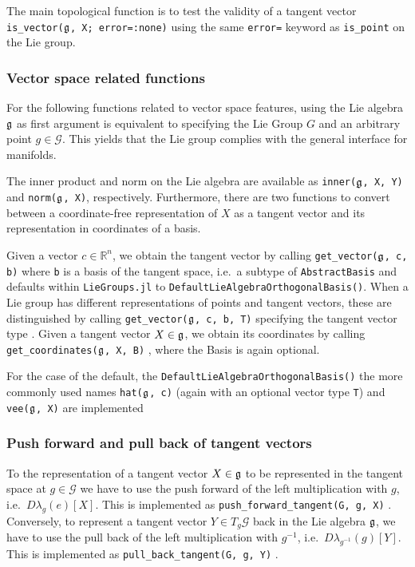 \documentclass{juliacon}
\begin{document}
The main topological function is to test the validity of a tangent vector \verb|is_vector(|$\frak g$\verb|, X; error=:none)| using the same \verb|error=| keyword as \verb|is_point| on the Lie group.

\subsubsection*{Vector space related functions}
For the following functions related to vector space features, using the Lie algebra $\frak g$ as first argument is equivalent to specifying the Lie Group $G$ and an arbitrary point $g \in \mathcal G$. This yields that the Lie group complies with the general interface for manifolds.

The inner product and norm on the Lie algebra are available as \verb|inner(|$\frak g$\verb|, X, Y)| and \verb|norm(|$\frak g$\verb|, X)|, respectively.
Furthermore, there are two functions to convert between a coordinate-free representation of $X$ as a tangent vector and its representation in coordinates of a basis.

Given a vector $c \in \mathbb R^n$, we obtain the tangent vector by calling \verb|get_vector(|$\frak g$\verb|, c, b)| where \verb|b| is a basis of the tangent space, i.e.\ a subtype of \verb|AbstractBasis| and defaults within \verb|LieGroups.jl| to \verb|DefaultLieAlgebraOrthogonalBasis()|.
When a Lie group has different representations of points and tangent vectors, these are distinguished by calling \verb|get_vector(|$\frak g$\verb|, c, b, T)| specifying the tangent vector type%
.
Given a tangent vector $X \in \frak g$, we obtain its coordinates by calling \verb|get_coordinates(|$\frak g$\verb|, X, B)|%
, where the Basis is again optional.

For the case of the default, the \verb|DefaultLieAlgebraOrthogonalBasis()| the more commonly used names \verb|hat(|$\frak g$\verb|, c)|
(again with an optional vector type \verb|T|) and \verb|vee(|$\frak g$\verb|, X)|
are implemented

\subsubsection*{Push forward and pull back of tangent vectors}
To the representation of a tangent vector $X \in \frak g$ to be represented in the tangent space at $g \in \mathcal G$ we have to use the push forward of the left multiplication with $g$, i.e.\ $D\lambda_g(e)[X]$. This is implemented as \verb|push_forward_tangent(G, g, X)|%
.
Conversely, to represent a tangent vector $Y \in T_g\mathcal G$ back in the Lie algebra $\frak g$, we have to use the pull back of the left multiplication with $g^{-1}$, i.e.\ $D\lambda_{g^{-1}}(g)[Y]$. This is implemented as \verb|pull_back_tangent(G, g, Y)|%
.
\end{document}
